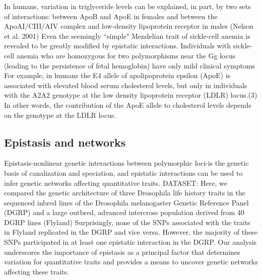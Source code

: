 In humans, variation in triglyceride levels can be explained, in part, by two sets of interactions: between ApoB and ApoE in females and between the ApoAI/CIII/AIV complex and low-density lipoprotein receptor in males (Nelson et al. 2001) \cite{culverhouse2002perspective}
Even the seemingly ``simple" Mendelian trait of sickle-cell anemia is revealed to be greatly modified by epistatic interactions. Individuals with sickle-cell anemia who are homozygous for two polymorphisms near the Gg locus (leading to the persistence of fetal hemoglobin) have only mild clinical symptoms \cite{culverhouse2002perspective}
For example, in humans the E4 allele of apolipoprotein epsilon (ApoE) is associated with elevated blood serum cholesterol levels, but only in individuals with the A2A2 genotype at the low density lipoprotein receptor (LDLR) locus.(3) In other words, the contribution of the ApoE allele to cholesterol levels depends on the genotype at the LDLR locus. \cite{tyler2009shadows}


\subsection{Epistasis and networks}
Epistasis-nonlinear genetic interactions between polymorphic loci-is the genetic basis of canalization and speciation, and epistatic interactions can be used to infer genetic networks affecting quantitative traits. \cite{huang2012epistasis}
DATASET: Here, we compared the genetic architecture of three Drosophila life history traits in the sequenced inbred lines of the Drosophila melanogaster Genetic Reference Panel (DGRP) and a large outbred, advanced intercross population derived from 40 DGRP lines (Flyland)\cite{huang2012epistasis}
Surprisingly, none of the SNPs associated with the traits in Flyland replicated in the DGRP and vice versa. However, the majority of these SNPs participated in at least one epistatic interaction in the DGRP.\cite{huang2012epistasis}
Our analysis underscores the importance of epistasis as a principal factor that determines variation for quantitative traits and provides a means to uncover genetic networks affecting these traits. \cite{huang2012epistasis}


